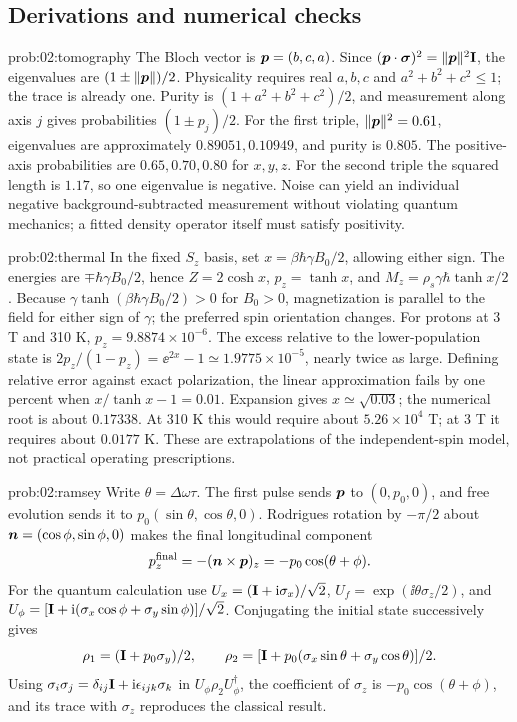 \subsection{Derivations and numerical checks}
\begin{solution}{prob:02:tomography}
The Bloch vector is \(\bm{p}=(b,c,a)\). Since
\((\bm{p}\cdot\bm{\sigma})^2=\lVert\bm{p}\rVert^2\mathbf{I}\), the eigenvalues are
\((1\pm\lVert\bm{p}\rVert)/2\). Physicality requires real \(a,b,c\) and
\(a^2+b^2+c^2\leq1\); the trace is already one.
Purity is \((1+a^2+b^2+c^2)/2\), and measurement along axis \(j\) gives probabilities \((1\pm p_j)/2\).
For the first triple, \(\lVert\bm{p}\rVert^2=0.61\), eigenvalues are approximately \(0.89051,0.10949\), and purity is \(0.805\).
The positive-axis probabilities are \(0.65,0.70,0.80\) for \(x,y,z\).
For the second triple the squared length is \(1.17\), so one eigenvalue is negative. Noise can yield an individual negative background-subtracted measurement without violating quantum mechanics; a fitted density operator itself must satisfy positivity.
\end{solution}
\begin{solution}{prob:02:thermal}
In the fixed \(S_z\) basis, set \(x=\beta\hbar\gamma B_0/2\), allowing either sign.
The energies are \(\mp\hbar\gamma B_0/2\), hence
\(Z=2\cosh x\), \(p_z=\tanh x\), and
\(M_z=\rho_s\gamma\hbar\tanh x/2\).
Because \(\gamma\tanh(\beta\hbar\gamma B_0/2)>0\) for \(B_0>0\), magnetization is parallel to the field for either sign of \(\gamma\); the preferred spin orientation changes.
For protons at 3 T and 310 K, \(p_z=9.8874\times10^{-6}\).
The excess relative to the lower-population state is
\(2p_z/(1-p_z)=\ee^{2x}-1\simeq1.9775\times10^{-5}\), nearly twice as large.
Defining relative error against exact polarization, the linear approximation fails by one percent when
\(x/\tanh x-1=0.01\). Expansion gives \(x\simeq\sqrt{0.03}\); the numerical root is about \(0.17338\).
At 310 K this would require about \(5.26\times10^4\) T; at 3 T it requires about \(0.0177\) K. These are extrapolations of the independent-spin model, not practical operating prescriptions.
\end{solution}
\begin{solution}{prob:02:ramsey}
Write \(\theta=\Delta\omega\tau\).
The first pulse sends \(\bm{p}\) to \((0,p_0,0)\), and free evolution sends it to
\(p_0(\sin\theta,\cos\theta,0)\).
Rodrigues rotation by \(-\pi/2\) about
\(\bm{n}=(\cos\phi,\sin\phi,0)\) makes the final longitudinal component
\[
 p_z^{\mathrm{final}}=-(\bm{n}\times\bm{p})_z
 =-p_0\cos(\theta+\phi).
\]
For the quantum calculation use
\(U_x=(\mathbf{I}+\mathrm{i}\sigma_x)/\sqrt2\),
\(U_f=\exp(\ii\theta\sigma_z/2)\), and
\(U_\phi=[\mathbf{I}+\mathrm{i}(\sigma_x\cos\phi+\sigma_y\sin\phi)]/\sqrt2\).
Conjugating the initial state successively gives
\[
 \rho_1=(\mathbf{I}+p_0\sigma_y)/2,\qquad
 \rho_2=[\mathbf{I}+p_0(\sigma_x\sin\theta+\sigma_y\cos\theta)]/2.
\]
Using \(\sigma_i\sigma_j=\delta_{ij}\mathbf{I}+\mathrm{i}\epsilon_{ijk}\sigma_k\) in
\(U_\phi\rho_2U_\phi^\dagger\), the coefficient of \(\sigma_z\) is
\(-p_0\cos(\theta+\phi)\), and its trace with \(\sigma_z\) reproduces the classical result.
\end{solution}

